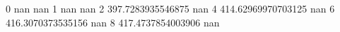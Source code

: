 0 nan nan
1 nan nan
2 397.7283935546875 nan
4 414.62969970703125 nan
6 416.3070373535156 nan
8 417.4737854003906 nan
